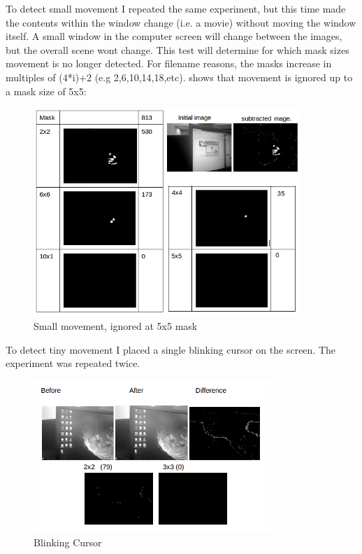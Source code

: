 To detect small movement I repeated the same experiment, but this time made the contents within the window change (i.e. a movie) without moving the window itself.  A small window in the computer screen will change between the images, but the overall scene wont change. This test will determine for which mask sizes movement is no longer detected.
For filename reasons, the masks increase in multiples of (4*i)+2  (e.g 2,6,10,14,18,etc).  shows that movement is ignored up to a mask size of 5x5:
\begin{figure}[H]
	\vspace{30pt}
	\begin{center}
		\includegraphics[width=0.9\textwidth]{../images/ImageOps/SMALL}
	\end{center}
	\vspace{10pt}
	\caption{Small  movement, ignored at 5x5 mask}	
	\label{img:small}
	\vspace{20pt}
\end{figure}
\pagebreak
To  detect tiny movement I placed a single blinking cursor on the screen. The experiment was repeated twice.
\begin{figure}[H]
	\vspace{-10pt}
	\begin{center}
		\includegraphics[width=0.8\textwidth]{../images/ImageOps/CURSOR1}
	\end{center}
	\vspace{-20pt}
	\caption{Blinking Cursor}
	\label{img:curse1}
\end{figure}
